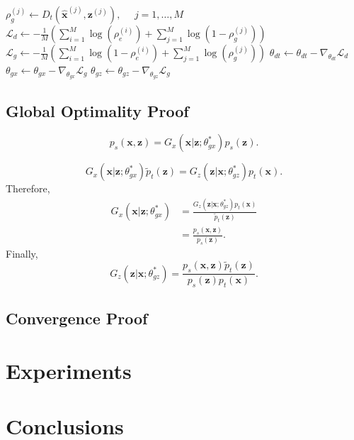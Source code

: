 \documentclass{article}
\begin{document}
\begin{algorithm}[tb]
\begin{algorithmic}
	\STATE $\rho_g^{(j)} \leftarrow D_t(\hat{\bm{x}}^{(j)}, \bm{z}^{(j)}), \ \ \ \ \ \ j = 1, \dots, M $
	\STATE $\mathcal{L}_d \leftarrow -\frac{1}{M} \left( \sum_{i=1}^{M} \log \left( \rho_e^{(i)} \right) + \sum_{j=1}^{M} \log \left( 1 - \rho_g^{(j)} \right) \right)$
	\STATE $\mathcal{L}_g \leftarrow -\frac{1}{M} \left( \sum_{i=1}^{M} \log \left( 1 - \rho_e^{(i)} \right) + \sum_{j=1}^{M} \log \left(\rho_g^{(j)} \right) \right)$
	\STATE $\theta_{dt} \leftarrow \theta_{dt} - \nabla_{\theta_{dt}}\mathcal{L}_d$
	\STATE $\theta_{gx} \leftarrow \theta_{gx} - \nabla_{\theta_{gx}}\mathcal{L}_g$
	\STATE $\theta_{gz} \leftarrow \theta_{gz} - \nabla_{\theta_{gz}}\mathcal{L}_g$
	\ENDFOR
\end{algorithmic}
\end{algorithm}

\subsection{Global Optimality Proof}

\begin{equation}
p_s(\bm{x},\bm{z}) = G_x(\bm{x}|\bm{z};\theta_{gx}^*)p_s(\bm{z}).
\end{equation}

\begin{equation}
G_x(\bm{x}|\bm{z};\theta_{gx}^*)\widetilde{p}_t(\bm{z}) = G_z(\bm{z}|\bm{x}; \theta_{gz}^*)p_t(\bm{x}).
\end{equation}
Therefore,
\begin{equation}
\begin{split}
G_x(\bm{x}|\bm{z};\theta_{gx}^*) &= \frac{G_z(\bm{z}|\bm{x}; \theta_{gz}^*)p_t(\bm{x})}{\widetilde{p}_t(\bm{z})}\\
&= \frac{p_s(\bm{x},\bm{z})}{p_s(\bm{z})}.
\end{split}
\end{equation}
Finally,
\begin{equation}
G_z(\bm{z}|\bm{x}; \theta_{gz}^*) = \frac{p_s(\bm{x},\bm{z})\widetilde{p}_t(\bm{z})}{p_s(\bm{z})p_t(\bm{x})}.
\end{equation}

\subsection{Convergence Proof}

\section{Experiments}

\section{Conclusions}

%

\end{document}
